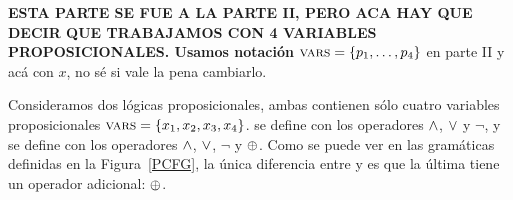 
\color{magenta}
{\bf 
ESTA PARTE SE FUE A LA PARTE II, PERO ACA HAY QUE DECIR QUE TRABAJAMOS CON 4 VARIABLES PROPOSICIONALES. Usamos notación $\textsc{vars}=\{p_1,\dots,p_4\}$} en parte II y acá con $x$, no sé si vale la pena cambiarlo.


Consideramos dos lógicas proposicionales, ambas contienen sólo cuatro variables proposicionales  $\textsc{vars}=\{x_1, x_2, x_3, x_4\}$. \grambool se define con los operadores $\wedge$, $\vee$ y $\lnot$, y \gramboolxor se define con los operadores $\wedge$, $\vee$, $\lnot$ y $\oplus$. Como se puede ver en las gramáticas definidas en la Figura~\ref{PCFG}, la única diferencia entre \grambool y \gramboolxor es que la última tiene un operador adicional: $\oplus$.  

